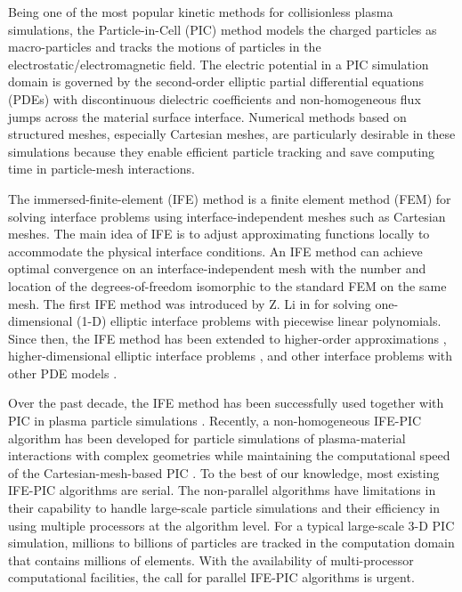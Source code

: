 \documentclass{siamart171218}
\begin{document}
Being one of the most popular kinetic methods for collisionless plasma simulations,
the Particle-in-Cell (PIC) method \cite{1991BirdsallLangdon}
models the charged particles as macro-particles and tracks the motions of particles
in the electrostatic/electromagnetic field.
The electric potential in a PIC simulation domain
is governed by the second-order elliptic partial differential equations (PDEs)
with discontinuous dielectric coefficients
and non-homogeneous flux jumps across the material surface interface.
Numerical methods based on structured meshes, especially Cartesian meshes,
are particularly desirable in these simulations
because they enable efficient particle tracking and save computing time
in particle-mesh interactions.

The immersed-finite-element (IFE) method is a finite element method (FEM)
for solving interface problems using interface-independent meshes
such as Cartesian meshes.
The main idea of IFE is to adjust approximating functions locally
to accommodate the physical interface conditions.
An IFE method can achieve optimal convergence on an interface-independent mesh
with the number and location of the degrees-of-freedom isomorphic
to the standard FEM on the same mesh.
The first IFE method was introduced by Z. Li in \cite{1998Li}
for solving one-dimensional (1-D) elliptic interface problems with piecewise linear polynomials.
Since then, the IFE method has been extended to higher-order approximations
\cite{2009AdjeridLin, 2006CampLinLinSun, 2017CaoZhangZhang, 2016GuzmanSanchezSarkis2},
higher-dimensional elliptic interface problems
\cite{2020GuoLin2, 2020GuoZhang,2003LiLinWu, 2019HeZhang, 2015LinLinZhang,
2019LinSheenZhang, 2010VallaghePapadopoulo},
and other interface problems with other PDE models
\cite{2019AdjeridChaabaneLinYue,2020AdjeridLinZhuang,2019AdjeridMoon,2020GuoLinLin,
2013HeLinLinZhang,2013LinSheenZhang}.

Over the past decade, the IFE method has been successfully used
together with PIC in plasma particle simulations
\cite{2018BaiCaoChuZhang, 2016CaoChuZhangZhang,
2015JianChuCaoCaoHeXia,2005KafafyLinLinWang, 2005KafafyWangLin}.
Recently, a non-homogeneous IFE-PIC algorithm has been developed
for particle simulations of plasma-material interactions with complex geometries
while maintaining the computational speed of the Cartesian-mesh-based PIC
\cite{Chu_ijnam2017_software, Han_usc_dissertation2015, Han_ieee2016_charging,
Han_ife_jcp2016,CLu_JWan_YCao_XMHe_1,CLu_ZYang_JBai_YCao_XMHe_1}.
%
To the best of our knowledge, most existing IFE-PIC algorithms are serial.
The non-parallel algorithms have limitations in their capability
to handle large-scale particle simulations
and their efficiency in using multiple processors at the algorithm level.
For a typical large-scale 3-D PIC simulation,
millions to billions of particles are tracked in the computation domain
that contains millions of elements.
With the availability of multi-processor computational facilities,
the call for parallel IFE-PIC algorithms is urgent.
\end{document}
